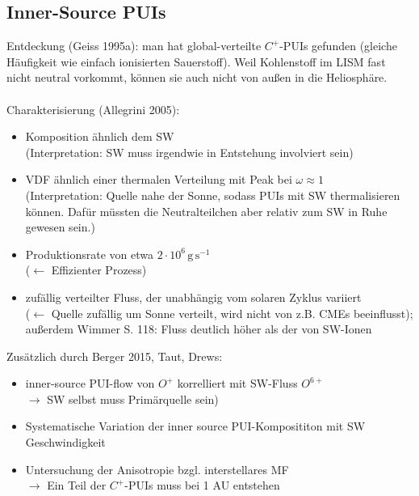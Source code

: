 \documentclass[]{article}
\begin{document}
\subsection{Inner-Source PUIs}
Entdeckung (Geiss 1995a): man hat global-verteilte $C^+$-PUIs gefunden (gleiche Häufigkeit wie einfach ionisierten Sauerstoff). Weil Kohlenstoff im LISM fast nicht neutral vorkommt, können sie auch nicht von außen in die Heliosphäre.
\\
\\
Charakterisierung (Allegrini 2005):
\begin{itemize}
	\item Komposition ähnlich dem SW \\(Interpretation: SW muss irgendwie in Entstehung involviert sein)
	\item VDF ähnlich einer thermalen Verteilung mit Peak bei $\omega \approx 1$ \\(Interpretation: Quelle nahe der Sonne, sodass PUIs mit SW thermalisieren können. Dafür müssten die Neutralteilchen aber relativ zum SW in Ruhe gewesen sein.)
	\item Produktionsrate von etwa $2 \cdot 10^6 \,\mathrm{g\,s^{-1}}$ \\($\leftarrow$ Effizienter Prozess)
	\item zufällig verteilter Fluss, der unabhängig vom solaren Zyklus variiert \\($\leftarrow$ Quelle zufällig um Sonne verteilt, wird nicht von z.B. CMEs beeinflusst); außerdem Wimmer S. 118: Fluss deutlich höher als der von SW-Ionen
\end{itemize}
Zusätzlich durch Berger 2015, Taut, Drews:
\begin{itemize}
	\item inner-source PUI-flow von $O^+$ korrelliert mit SW-Fluss $O^{6+}$ \\
	$\rightarrow$ SW selbst muss Primärquelle sein)
	\item Systematische Variation der inner source PUI-Komposititon mit SW Geschwindigkeit
	\item Untersuchung der Anisotropie bzgl. interstellares MF \\
	$\rightarrow$ Ein Teil der $C^+$-PUIs muss bei 1 AU entstehen
\end{itemize}
\end{document}
